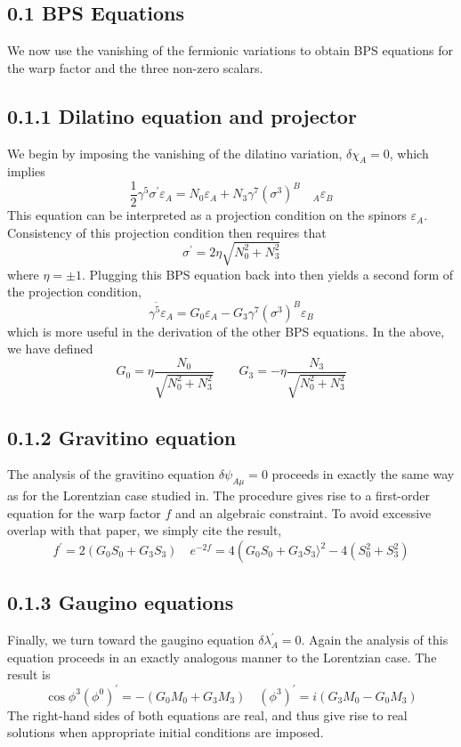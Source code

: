 \documentclass{article}
\begin{document}
\subsection*{0.1 BPS Equations}
We now use the vanishing of the fermionic variations to obtain BPS equations for the warp factor and the three non-zero scalars.
\subsection*{0.1.1 Dilatino equation and projector}
We begin by imposing the vanishing of the dilatino variation, \(\delta \chi_{A}=0\), which implies
\[
\frac{1}{2} \gamma^{5} \sigma^{\prime} \varepsilon_{A}=N_{0} \varepsilon_{A}+N_{3} \gamma^{7} \left(\sigma^{3}\right)^{B} \quad_{A} \varepsilon_{B}
\]
This equation can be interpreted as a projection condition on the spinors \(\varepsilon_{A}\). Consistency of this projection condition then requires that
\[
\sigma^{\prime}=2 \eta \sqrt{N_{0}^{2}+N_{3}^{2}}
\]
where \(\eta= \pm 1\). Plugging this BPS equation back into then yields a second form of the projection condition,
\[
\gamma^{\tilde{5}} \varepsilon_{A}=G_{0} \varepsilon_{A}-G_{3} \gamma^{7}\left(\sigma^{3}\right)^{B} \varepsilon_{B}
\]
which is more useful in the derivation of the other BPS equations. In the above, we have defined
\[
G_{0}=\eta \frac{N_{0}}{\sqrt{N_{0}^{2}+N_{3}^{2}}} \quad \quad G_{3}=-\eta \frac{N_{3}}{\sqrt{N_{0}^{2}+N_{3}^{2}}}
\]
\subsection*{0.1.2 Gravitino equation}
The analysis of the gravitino equation \(\delta \psi_{A \mu}=0\) proceeds in exactly the same way as for the Lorentzian case studied in. The procedure gives rise to a first-order equation for the warp factor \(f\) and an algebraic constraint. To avoid excessive overlap with that paper, we simply cite the result,
\[
f^{\prime}=2\left(G_{0} S_{0}+G_{3} S_{3}\right) \quad e^{-2 f}=4\left(G_{0} S_{0}+G_{3} S_{3}\rangle^{2}-4\left(S_{0}^{2}+S_{3}^{2}\right)\right.
\]
\subsection*{0.1.3 Gaugino equations}
Finally, we turn toward the gaugino equation \(\delta \lambda_{A}^{\prime}=0\). Again the analysis of this equation proceeds in an exactly analogous manner to the Lorentzian case. The result is
\[
\cos \phi^{3}\left(\phi^{0}\right)^{\prime}=-\left(G_{0} M_{0}+G_{3} M_{3}\right) \quad\left(\phi^{3}\right)^{\prime}=i\left(G_{3} M_{0}-G_{0} M_{3}\right)
\]
The right-hand sides of both equations are real, and thus give rise to real solutions when appropriate initial conditions are imposed.
\end{document}
